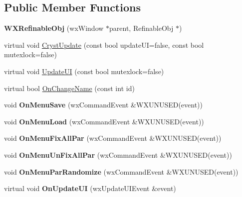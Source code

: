 \subsection*{Public Member Functions}
\begin{DoxyCompactItemize}
\item 
\mbox{\label{class_obj_cryst_1_1_w_x_refinable_obj_a2765af8e024ebd42ced05b4f0e991db7}} 
{\bfseries W\+X\+Refinable\+Obj} (wx\+Window $\ast$parent, Refinable\+Obj $\ast$)
\item 
virtual void \mbox{\hyperlink{class_obj_cryst_1_1_w_x_refinable_obj_a8249d288e62ad1ebffeea91f77ae37a3}{Cryst\+Update}} (const bool update\+UI=false, const bool mutexlock=false)
\item 
virtual void \mbox{\hyperlink{class_obj_cryst_1_1_w_x_refinable_obj_acbf70975a79661a73a1ae3c39c9c3045}{Update\+UI}} (const bool mutexlock=false)
\item 
virtual bool \mbox{\hyperlink{class_obj_cryst_1_1_w_x_refinable_obj_a1a13aaa3b69044cff0d1c257dea2acb0}{On\+Change\+Name}} (const int id)
\item 
\mbox{\label{class_obj_cryst_1_1_w_x_refinable_obj_a1e65b19af240ac0680f9ce8d6c429328}} 
void {\bfseries On\+Menu\+Save} (wx\+Command\+Event \&W\+X\+U\+N\+U\+S\+ED(event))
\item 
\mbox{\label{class_obj_cryst_1_1_w_x_refinable_obj_aa907c618a7a19c49daece82a63c904f6}} 
void {\bfseries On\+Menu\+Load} (wx\+Command\+Event \&W\+X\+U\+N\+U\+S\+ED(event))
\item 
\mbox{\label{class_obj_cryst_1_1_w_x_refinable_obj_a8589d79fe29e9a011637c3076b5bdaa7}} 
void {\bfseries On\+Menu\+Fix\+All\+Par} (wx\+Command\+Event \&W\+X\+U\+N\+U\+S\+ED(event))
\item 
\mbox{\label{class_obj_cryst_1_1_w_x_refinable_obj_ad04001216b52fc977de689ffad29a86b}} 
void {\bfseries On\+Menu\+Un\+Fix\+All\+Par} (wx\+Command\+Event \&W\+X\+U\+N\+U\+S\+ED(event))
\item 
\mbox{\label{class_obj_cryst_1_1_w_x_refinable_obj_a308d9d22e41ff6d681fe2e7de09ead98}} 
void {\bfseries On\+Menu\+Par\+Randomize} (wx\+Command\+Event \&W\+X\+U\+N\+U\+S\+ED(event))
\item 
\mbox{\label{class_obj_cryst_1_1_w_x_refinable_obj_ac5d5afc91191f8c14b64c93b38740c33}} 
virtual void {\bfseries On\+Update\+UI} (wx\+Update\+U\+I\+Event \&event)
\end{DoxyCompactItemize}
